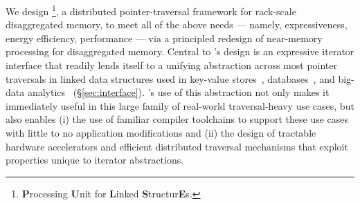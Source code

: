 

We design \name\footnote{\textbf{P}rocessing \textbf{U}nit for \textbf{L}inked \textbf{S}tructur\textbf{E}s.}, a distributed pointer-traversal framework for rack-scale disaggregated memory, to meet all of the above needs --- namely, expressiveness, energy efficiency, performance --- via a principled redesign of near-memory processing for disaggregated memory. Central to \name's design is an expressive iterator interface that readily lends itself to a unifying abstraction across most pointer traversals in linked data structures used in key-value stores~\cite{redis, memcached}, databases~\cite{wiredtiger, btree1, btree2, trie1, trie3}, and big-data analytics~\cite{powergraph, graphx, graphchi, pagerank} (\S\ref{sec:interface}). \name's use of this abstraction not only makes it immediately useful in this large family of real-world traversal-heavy use cases, but also enables (i) the use of familiar compiler toolchains to support these use cases with little to no application modifications and (ii) the design of tractable hardware accelerators and efficient distributed traversal mechanisms that exploit properties unique to iterator abstractions.

